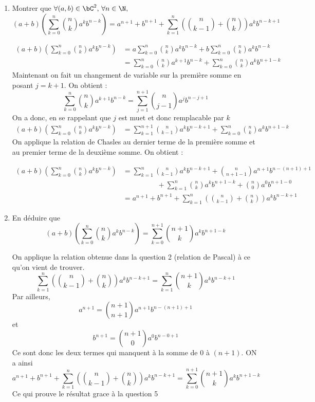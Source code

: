 \begin{correction}
\begin{enumerate}
\item Montrer que $\forall (a,b)\in \bC^2,\,  \forall n \in \N, $
$$(a+b)\left( \sum_{k=0}^n \binom{n}{k}a^k b^{n-k}\right) = a^{n+1}+b^{n+1}+\sum_{k=1}^{n} \left( \binom{n}{k-1}+\binom{n}{k}\right)a^{k} b^{n-k+1}$$



\begin{align*}
(a+b)\left( \sum_{k=0}^n \binom{n}{k}a^k b^{n-k}\right) &=a  \sum_{k=0}^n \binom{n}{k}a^k b^{n-k} +b\sum_{k=0}^n \binom{n}{k}a^k b^{n-k}\\
&= \sum_{k=0}^n \binom{n}{k}a^{k+1} b^{n-k} +\sum_{k=0}^n \binom{n}{k}a^k b^{n+1-k} 
\end{align*}
Maintenant on fait un changement de variable sur la première somme en posant $j =k+1$. On obtient : 
$$ \sum_{k=0}^n \binom{n}{k}a^{k+1} b^{n-k}= \sum_{j=1}^{n+1} \binom{n}{j-1}a^{j} b^{n-j+1}$$
On a donc, en se rappelant que $j$ est muet et donc remplacable par $k$
\begin{align*}
(a+b)\left( \sum_{k=0}^n \binom{n}{k}a^k b^{n-k}\right) &= \sum_{k=1}^{n+1} \binom{n}{k-1}a^{k} b^{n-k+1}+ \sum_{k=0}^{n} \binom{n}{k}a^{k} b^{n+1-k}
\end{align*}
On applique la relation de Chasles au  dernier terme de la première somme et au premier terme de la deuxième somme. On obtient : 

\begin{align*}
(a+b)\left( \sum_{k=0}^n \binom{n}{k}a^k b^{n-k}\right) &= \sum_{k=1}^{n} \binom{n}{k-1}a^{k} b^{n-k+1}+\binom{n}{n+1-1}a^{n+1} b^{n-(n+1)+1} \\& \hspace{2cm} +\sum_{k=1}^{n} \binom{n}{k}a^{k} b^{n+1-k} + \binom{n}{0}a^{0} b^{n+1-0} \\
&=  a^{n+1}+b^{n+1}+\sum_{k=1}^{n} \left( \binom{n}{k-1}+\binom{n}{k}\right)a^{k} b^{n-k+1}
\end{align*}




\item En déduire que 
$$(a+b)\left( \sum_{k=0}^n \binom{n}{k}a^k b^{n-k}\right) = \sum_{k=0}^{n+1}  \binom{n+1}{k}a^{k} b^{n+1-k}$$



On applique la relation obtenue dans la question 2 (relation de Pascal) à ce qu'on vient de trouver. 
$$\sum_{k=1}^{n} \left( \binom{n}{k-1}+\binom{n}{k}\right)a^{k} b^{n-k+1} = \sum_{k=1}^{n} \binom{n+1}{k}a^{k} b^{n-k+1}$$
Par ailleurs, 
$$a^{n+1} = \binom{n+1}{n+1}a^{n+1} b^{n-(n+1)+1}$$
et 
$$b^{n+1} = \binom{n+1}{0}a^{0} b^{n-0+1}$$
Ce sont donc les deux termes qui manquent à la somme de $0$ à $(n+1)$. ON a ainsi 
$$a^{n+1}+b^{n+1}+\sum_{k=1}^{n} \left( \binom{n}{k-1}+\binom{n}{k}\right)a^{k} b^{n-k+1} =\sum_{k=0}^{n+1}  \binom{n+1}{k}a^{k} b^{n+1-k}$$
Ce qui prouve le résultat grace à la question 5





\end{enumerate}
\end{correction}
